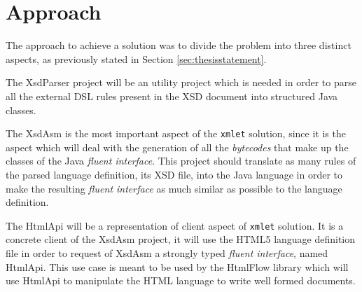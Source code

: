 \newpage

\section{Approach}
\label{sec:approach}

The approach to achieve a solution was to divide the problem into three distinct aspects, as previously stated in Section  \ref{sec:thesisstatement}. 

\noindent
The XsdParser project will be an utility project which is needed in order to parse all the external \ac{DSL} rules present in the \ac{XSD} document into structured Java classes. 

\noindent
The XsdAsm is the most important aspect of the \texttt{xmlet} solution, since it is the aspect which will deal with the generation of all the \textit{bytecodes} that make up the classes of the Java \textit{fluent interface}. This project should translate as many rules of the parsed language definition, its \ac{XSD} file, into the Java language in order to make the resulting \textit{fluent interface} as much similar as possible to the language definition.

\noindent
The HtmlApi will be a representation of client aspect of \texttt{xmlet} solution. It is a concrete client of the XsdAsm project, it will use the \ac{HTML}5 language definition file in order to request of XsdAsm a strongly typed \textit{fluent interface}, named HtmlApi. This use case is meant to be used by the HtmlFlow library which will use HtmlApi to manipulate the \ac{HTML} language to write well formed documents.